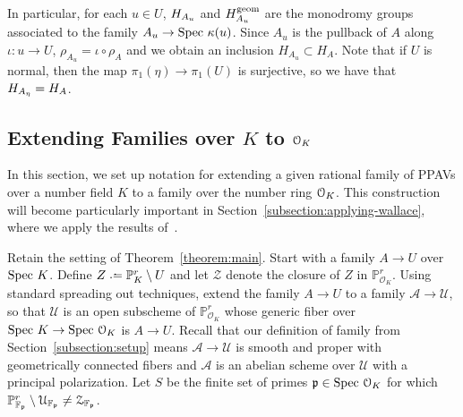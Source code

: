 In particular, for each $u \in U$, $H_{A_u}$ and $H_{A_u}^{\operatorname{geom}}$ are the monodromy groups associated to the family $A_u \to \text{Spec } \kappa(u)$. Since $A_u$ is the pullback of $A$ along $\iota: u \rightarrow U$, $\rho_{A_u} = \iota \circ \rho_A$ and we obtain an inclusion $H_{A_u} \subset H_A$. Note that if $U$ is normal, then the map $\pi_1(\eta) \rightarrow \pi_1(U)$ is surjective, so we have that $H_{A_\eta} = H_A$.

\subsection{Extending Families over $K$ to $\mathcal O_K$}
\label{subsection:notation-for-families}
In this section, we set up notation for extending a given rational family of PPAVs over a number field $K$ to a family over the number ring $\mathcal O_K$.
This construction will become particularly important in Section~\ref{subsection:applying-wallace}, where we apply the results of~\cite{scoopdedoo}.

Retain the setting of Theorem~\ref{theorem:main}.
Start with a family $A \rightarrow U$ over $\text{Spec } K$.
Define $Z \defeq \mathbb P_K^r \setminus U$
and let $\mathcal Z$ denote the closure of $Z$ in $\mathbb P^r_{\mathcal O_K}$.
Using standard spreading out techniques,
extend the family $A \rightarrow U$ to a family $\mathcal A \rightarrow \mathcal U$, so that $\mathcal U$ is an open subscheme of $\mathbb P^r_{\mathcal O_K}$
whose generic fiber over $\text{Spec } K \rightarrow \text{Spec } \mathcal O_K$
is $A \rightarrow U$.
Recall that our definition of family from Section~\ref{subsection:setup} means
$\mathcal A \rightarrow \mathcal U$ is smooth and proper with geometrically connected fibers and $\mathcal A$ is an abelian scheme over $\mathcal U$ with a principal polarization.
Let $S$ be the finite set of primes ${\mathfrak p} \in \text{Spec } \mathcal O_K$
for which $\mathbb P^r_{\mathbb F_\mathfrak p} \setminus \mathcal U_{\mathbb F_\mathfrak p} \neq \mathcal Z_{\mathbb F_\mathfrak p}$.

